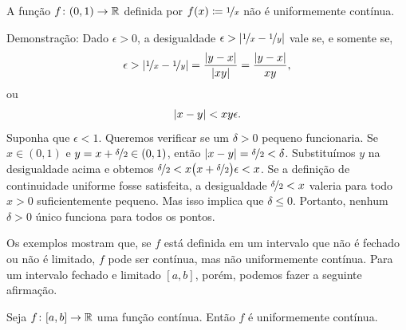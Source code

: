 \begin{example}
A função $f \colon (0,1) \to {\mathbb{R}}$ definida por
$f(x) \coloneqq \nicefrac{1}{x}$ não é uniformemente contínua.

Demonstração: Dado $\epsilon > 0$, a desigualdade
$\epsilon > \left\lvert {\nicefrac{1}{x}-\nicefrac{1}{y}} \right\rvert$ vale se, e somente se,
\begin{equation*}
\epsilon >
\left\lvert {\nicefrac{1}{x}-\nicefrac{1}{y}} \right\rvert
=
\frac{\lvert {y-x} \rvert}{\lvert {xy} \rvert}
=
\frac{\lvert {y-x} \rvert}{xy} ,
\end{equation*}
ou
\begin{equation*}
\lvert {x-y} \rvert < xy\epsilon .
\end{equation*}
Suponha que $\epsilon < 1$.
Queremos verificar se um $\delta > 0$ pequeno funcionaria.
Se $x \in (0,1)$ e
$y = x+\nicefrac{\delta}{2} \in (0,1)$,
então $\lvert {x-y} \rvert = \nicefrac{\delta}{2} < \delta$.
Substituímos $y$ na desigualdade acima e obtemos
$\nicefrac{\delta}{2} < x \bigl(x+\nicefrac{\delta}{2}\bigr)\epsilon < x$.
Se a definição de continuidade uniforme fosse satisfeita,
a desigualdade $\nicefrac{\delta}{2} < x$ valeria para todo $x > 0$
suficientemente pequeno. Mas isso implica que $\delta \leq 0$.
Portanto, nenhum $\delta > 0$ único funciona para todos os pontos.
\end{example}

Os exemplos mostram que, se $f$ está definida em um intervalo que não é
fechado ou não é limitado, $f$ pode ser contínua, mas não uniformemente contínua.
Para um intervalo fechado e limitado $[a,b]$, porém, podemos fazer a seguinte
afirmação.

\begin{thm} \label{unifcont:thm}
Seja $f \colon [a,b] \to {\mathbb{R}}$ uma função contínua. Então $f$
é uniformemente contínua.
\end{thm}

